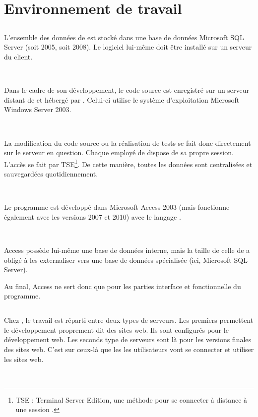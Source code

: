 \chapter{Environnement de travail}
\section{\solulog}
L'ensemble des données de \integrale{} est stocké dans une base de données Microsoft SQL Server (soit 2005, soit 2008). Le logiciel lui-même doit être installé sur un serveur du client.

~

Dans le cadre de son développement, le code source est enregistré sur un serveur distant de \solulog{} et hébergé par \fidit. Celui-ci utilise le système d'exploitation Microsoft Windows Server 2003.

~

La modification du code source ou la réalisation de tests se fait donc directement sur le serveur en question. Chaque employé de \solulog{} dispose de sa propre session. L'accès se fait par TSE\footnote{TSE : Terminal Server Edition, une méthode pour se connecter à distance à une session .}. De cette manière, toutes les données sont centralisées et sauvegardées quotidiennement.

~

Le programme \integrale{} est développé dans Microsoft Access 2003 (mais fonctionne également avec les versions 2007 et 2010) avec le langage \vb.

~

Access possède lui-même une base de données interne, mais la taille de celle de \integrale{} a obligé \solulog{} à les externaliser vers une base de données spécialisée (ici, Microsoft SQL Server).

Au final, Access ne sert donc que pour les parties interface et fonctionnelle du programme.

\section{\fidit}
Chez \fidit, le travail est réparti entre deux types de serveurs. Les premiers permettent le développement proprement dit des sites web. Ils sont configurés pour le développement web. Les seconds type de serveurs sont là pour les versions finales des sites web. C'est sur ceux-là que les les utilisateurs vont se connecter et utiliser les sites web.

~

